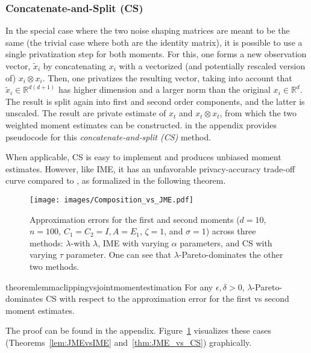 \subsubsection{Concatenate-and-Split (CS)}
%
In the special case where the two noise shaping matrices are meant to be the same (\eg the trivial case where both are the identity matrix), it is possible to use a single privatization step for both moments.
%
For this, one forms a new observation vector, $\tilde x_i$ by concatenating $x_i$ with a vectorized (and potentially rescaled version of) $x_i \otimes x_i$. 
%
Then, one privatizes the resulting vector, taking into account that $\tilde x_i\in\mathbb{R}^{d(d+1)}$ has higher dimension and a larger norm than the original $x_i\in\mathbb{R}^{d}$. 
%
The result is split again into first and second order components, and the latter is unscaled. 
%
The result are private estimate of $x_t$ and $x_t\otimes x_t$, from which the two weighted  moment estimates can be constructed.
%
 in the appendix provides pseudocode 
for this \emph{concatenate-and-split (CS)} method. 

When applicable, CS is easy to implement and produces unbiased 
moment estimates.
%
However, like IME, it has an unfavorable privacy-accuracy trade-off curve compared to \acronym, as formalized in the following theorem.

\begin{figure}[t]
    \centering
    \texttt{[image: images/Composition\_vs\_JME.pdf]}
    \caption{Approximation errors for the first and second moments  ($d = 10$, $n = 100$, $C_1 = C_2 = I, A=E_1$, $\zeta = 1$, and $\sigma = 1$) across three methods: $\lambda$-\acronym with $\lambda$, IME with varying $\alpha$ parameters, and CS with varying $\tau$ parameter. 
    One can see that $\lambda$-\acronym Pareto-dominates the other two methods.}
    \label{fig:composition_vs_JME}
\end{figure}


\begin{restatable}[\acronym vs CS]{theorem}{lemmaclippingvsjointmomentestimation}\label{thm:JME_vs_CS}
For any $\epsilon,\delta>0$, $\lambda$-\acronym Pareto-dominates CS with 
respect to the approximation error for the first vs second moment estimates.
\end{restatable}

The proof can be found in the appendix. Figure~\ref{fig:composition_vs_JME} visualizes these cases (Theorems~\ref{lem:JMEvsIME} and~\ref{thm:JME_vs_CS}) graphically. 


